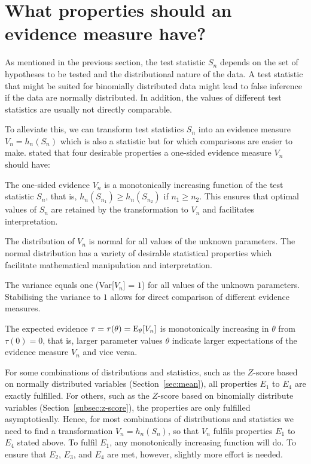\section{What properties should an evidence measure have?}
\label{sec:evidence_properties}
As mentioned in the previous section, the test statistic $S_n$ depends on the set of hypotheses to be tested and the distributional nature of the data. A test statistic that might be suited for binomially distributed data might lead to false inference if the data are normally distributed. In addition, the values of different test statistics are usually not directly comparable.\par
To alleviate this, we can transform test statistics $S_n$ into an evidence measure $V_n  = h_n(S_n)$ which is also a statistic but for which comparisons are easier to make. \citet[p.~115]{kulinskaya_meta_2008} stated that four desirable properties a one-sided evidence measure $V_n$ should have:
\begin{description}[leftmargin=!,labelwidth=\widthof{\bfseries $\boldsymbol{E_4}$}]
    \item [$\boldsymbol{E_1}$] The one-sided evidence $V_n$ is a monotonically increasing function of the test statistic $S_n$, that is, $h_n(S_{n_1}) \geq h_n(S_{n_2})$ if $n_1 \geq n_2$.
    This ensures that optimal values of $S_n$ are retained by the transformation to $V_n$ and facilitates interpretation.\\
    \item [$\boldsymbol{E_2}$] The distribution of $V_n$ is normal for all values of the unknown parameters. The normal distribution has a variety of desirable statistical properties which facilitate mathematical manipulation and interpretation.\\
    \item [$\boldsymbol{E_3}$] The variance equals one (Var[$V_n$] = $1$) for all values of the unknown parameters. Stabilising the variance to $1$ allows for direct comparison of different evidence measures.\\
    \item [$\boldsymbol{E_4}$] The expected evidence $\tau = \tau(\theta) = \operatorname{\text{E}}_{\theta}[V_n]$ is monotonically increasing in $\theta$ from $\tau(0)=0$, that is, larger parameter values $\theta$ indicate larger expectations of the evidence measure $V_n$ and vice versa.
\end{description}
For some combinations of distributions and statistics, such as the $Z$-score based on normally distributed variables (Section~\ref{sec:mean}), all properties $E_1$ to $E_4$ are exactly fulfilled. For others, such as the $Z$-score based on binomially distribute variables (Section~\ref{subsec:z-score}), the properties are only fulfilled asymptotically. Hence, for most combinations of distributions and statistics we need to find a transformation $V_n = h_n(S_n)$, so that $V_n$ fulfils properties $E_1$ to $E_4$ stated above. To fulfil $E_1$, any monotonically increasing function will do. To ensure that $E_2$, $E_3$, and $E_4$ are met, however, slightly more effort is needed.

